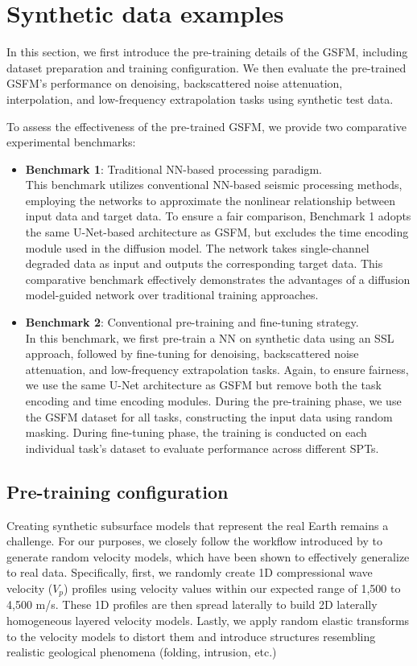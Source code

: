 \section{Synthetic data examples}
In this section, we first introduce the pre-training details of the GSFM, including dataset preparation and training configuration. We then evaluate the pre-trained GSFM's performance on denoising, backscattered noise attenuation, interpolation, and low-frequency extrapolation tasks using synthetic test data. 

To assess the effectiveness of the pre-trained GSFM, we provide two comparative experimental benchmarks:
\begin{itemize}
    \item \textbf{Benchmark 1}: Traditional NN-based processing paradigm. \\
     This benchmark utilizes conventional NN-based seismic processing methods, employing the networks to approximate the nonlinear relationship between input data and target data. To ensure a fair comparison, Benchmark 1 adopts the same U-Net-based architecture as GSFM, but excludes the time encoding module used in the diffusion model. The network takes single-channel degraded data as input and outputs the corresponding target data. This comparative benchmark effectively demonstrates the advantages of a diffusion model-guided network over traditional training approaches.

     \item \textbf{Benchmark 2}: Conventional pre-training and fine-tuning strategy. \\
     In this benchmark, we first pre-train a NN on synthetic data using an SSL approach, followed by fine-tuning for denoising, backscattered noise attenuation, and low-frequency extrapolation tasks. Again, to ensure fairness, we use the same U-Net architecture as GSFM but remove both the task encoding and time encoding modules. During the pre-training phase, we use the GSFM dataset for all tasks, constructing the input data using random masking. During fine-tuning phase, the training is conducted on each individual task's dataset to evaluate performance across different SPTs.
\end{itemize}

\subsection{Pre-training configuration}
Creating synthetic subsurface models that represent the real Earth remains a challenge. For our purposes, we closely follow the workflow introduced by \cite{ovcharenko2022multi} to generate random velocity models, which have been shown to effectively generalize to real data. Specifically, first, we randomly create 1D compressional wave velocity ($V_p$) profiles using velocity values within our expected range of 1,500 to 4,500 m/s. These 1D profiles are then spread laterally to build 2D laterally homogeneous layered velocity models. Lastly, we apply random elastic transforms to the velocity models to distort them and introduce structures resembling realistic geological phenomena (folding, intrusion, etc.) 

